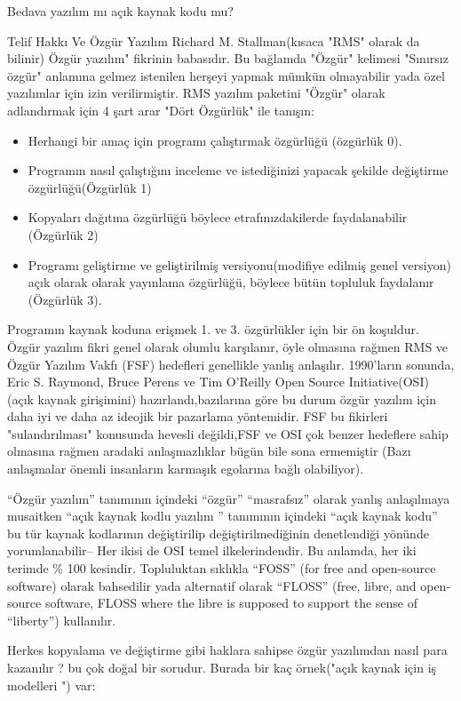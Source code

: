 \documentclass[10pt,a5paper]{book}
\begin{document}
\begin{section}{Bedava yazılım mı açık kaynak kodu mu?}
\begin{subsection}{Telif Hakkı Ve Özgür Yazılım}
Richard M. Stallman(kısaca "RMS" olarak da bilinir) Özgür yazılım" fikrinin babasıdır. Bu bağlamda "Özgür" kelimesi "Sınırsız özgür" anlamına gelmez istenilen herşeyi yapmak mümkün olmayabilir yada özel yazılımlar için izin verilirmiştir. RMS yazılım paketini "Özgür" olarak adlandırmak için 4 şart arar  "Dört Özgürlük" ile tanışın:

\begin{itemize}
 \item Herhangi bir amaç için programı çalıştırmak  özgürlüğü (özgürlük 0).
 \item Programın nasıl çalıştığını inceleme ve istediğinizi yapacak şekilde değiştirme özgürlüğü(Özgürlük 1)
 \item Kopyaları dağıtma özgürlüğü böylece etrafınızdakilerde faydalanabilir (Özgürlük 2)
 \item Programı geliştirme ve geliştirilmiş versiyonu(modifiye edilmiş genel versiyon) açık olarak olarak yayınlama özgürlüğü, böylece bütün topluluk
faydalanır (Özgürlük 3).
 \end{itemize}

Programın kaynak koduna erişmek 1. ve 3. özgürlükler için bir ön koşuldur. Özgür yazılım fikri genel olarak olumlu karşılanır, öyle olmasına rağmen RMS ve Özgür Yazılım Vakfı (FSF) hedefleri genellikle yanlış anlaşılır. 1990'ların sonunda, Eric S. Raymond, Bruce Perens ve Tim O'Reilly Open Source Initiative(OSI)(açık kaynak girişimini) hazırlandı,bazılarına göre bu durum özgür yazılım için daha iyi ve daha az ideojik bir pazarlama yöntemidir. FSF bu fikirleri "sulandırılması" konusunda hevesli değildi,FSF ve OSI çok benzer hedeflere sahip olmasına rağmen aradaki anlaşmazlıklar bügün bile sona ermemiştir (Bazı anlaşmalar önemli insanların karmaşık egolarına bağlı olabiliyor).

“Özgür yazılım” tanımının içindeki “özgür” “masrafsız” olarak yanlış anlaşılmaya musaitken “açık kaynak kodlu yazılım ” tanımının içindeki “açık kaynak kodu” bu tür kaynak kodlarının değiştirilip değiştirilmediğinin denetlendiği yönünde yorumlanabilir-- Her ikisi de OSI temel ilkelerindendir. Bu anlamda, her iki terimde \% 100 kesindir. Topluluktan sıklıkla “FOSS” (for free and open-source software) olarak bahsedilir yada alternatif olarak “FLOSS” (free, libre, and open-source software, FLOSS where the libre is supposed to support the sense of “liberty”) kullanılır.

Herkes kopyalama ve değiştirme gibi haklara sahipse özgür yazılımdan nasıl para kazanılır ? bu çok doğal bir sorudur. Burada bir kaç örnek("açık kaynak için iş modelleri ") var:


\end{subsection}
\end{section}
\end{document}
